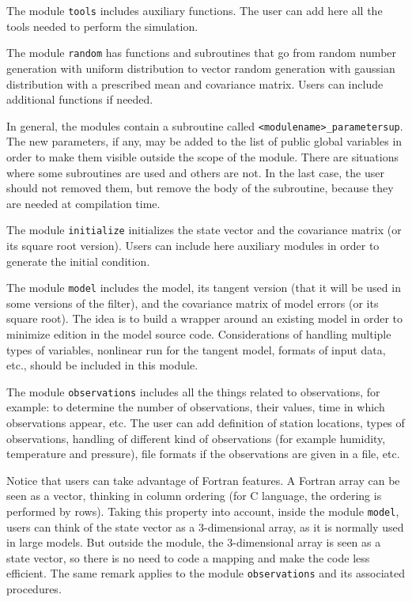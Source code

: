 \documentclass[12pt]{article}
\begin{document}
The module {\tt tools} includes auxiliary functions. The user can add here all the tools needed to perform the simulation. 

The module {\tt random} has functions and subroutines that go from random number generation with uniform distribution to vector random generation with gaussian distribution with a prescribed mean and covariance matrix. Users can include additional functions if needed.

In general, the modules contain a subroutine called {\tt <modulename>\_parametersup}. The new parameters, if any, may be added to the list of public global variables in order to make them visible outside the scope of the module. There are situations where some subroutines are used and others are not. In the last case, the user should not removed them, but remove the body of the subroutine, because they are needed at compilation time.

The module {\tt initialize} initializes the state vector and the covariance matrix (or its square root version). Users can include here auxiliary modules in order to generate the initial condition.

The module {\tt model} includes the model, its tangent version (that it will be used in some versions of the filter), and the covariance matrix of model errors (or its square root). The idea is to build a wrapper around an existing model in order to minimize edition in the model source code. Considerations of handling multiple types of variables, nonlinear run for the tangent model, formats of input data, etc., should be included in this module.

The module {\tt observations} includes all the things related to observations, for example: to determine the number of observations, their values, time in which observations appear, etc. The user can add definition of station locations, types of observations, handling of different kind of observations (for example humidity, temperature and pressure), file formats if the observations are given in a file, etc. 

Notice that users can take advantage of Fortran features. A Fortran array can be seen as a vector, thinking in column ordering (for C language, the ordering is performed by rows). Taking this property into account, inside the module {\tt model}, users can think of the state vector as a 3-dimensional array, as it is normally used in large models. But outside the module, the 3-dimensional array is seen as a state vector, so there is no need to code a mapping and make the code less efficient. The same remark applies to the module {\tt observations} and its associated procedures.
\end{document}
